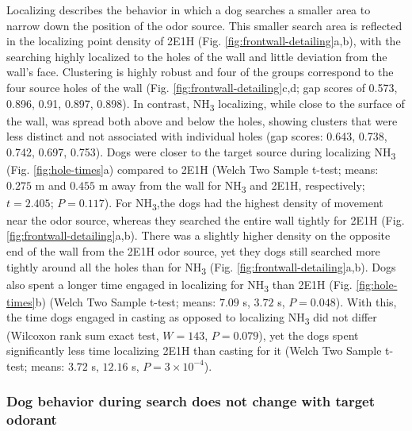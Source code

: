 \documentclass[
]{article}
\begin{document}
Localizing describes the behavior in which a dog searches a smaller area to narrow down the position of the odor source. This smaller search area is reflected in the localizing point density of 2E1H (Fig. \ref{fig:frontwall-detailing}a,b), with the searching highly localized to the holes of the wall and little deviation from the wall's face. Clustering is highly robust and four of the groups correspond to the four source holes of the wall (Fig. \ref{fig:frontwall-detailing}c,d; gap scores of 0.573, 0.896, 0.91, 0.897, 0.898). In contrast, NH\textsubscript{3} localizing, while close to the surface of the wall, was spread both above and below the holes, showing clusters that were less distinct and not associated with individual holes (gap scores: 0.643, 0.738, 0.742, 0.697, 0.753). Dogs were closer to the target source during localizing NH\textsubscript{3} (Fig. \ref{fig:hole-times}a) compared to 2E1H (Welch Two Sample t-test; means: \(0.275\) m and \(0.455\) m away from the wall for NH\textsubscript{3} and 2E1H, respectively; \(t = 2.405\); \(P = 0.117\)). For NH\textsubscript{3},the dogs had the highest density of movement near the odor source, whereas they searched the entire wall tightly for 2E1H (Fig. \ref{fig:frontwall-detailing}a,b). There was a slightly higher density on the opposite end of the wall from the 2E1H odor source, yet they dogs still searched more tightly around all the holes than for NH\textsubscript{3} (Fig. \ref{fig:frontwall-detailing}a,b). Dogs also spent a longer time engaged in localizing for NH\textsubscript{3} than 2E1H (Fig. \ref{fig:hole-times}b) (Welch Two Sample t-test; means: \(7.09\) s, \(3.72\) s, \(P = 0.048\)). With this, the time dogs engaged in casting as opposed to localizing NH\textsubscript{3} did not differ (Wilcoxon rank sum exact test, \(W = 143\), \(P = 0.079\)), yet the dogs spent significantly less time localizing 2E1H than casting for it (Welch Two Sample t-test; means: \(3.72\) s, \(12.16\) s, \(P = \ensuremath{3\times 10^{-4}}\)).

\hypertarget{dog-behavior-during-search-does-not-change-with-target-odorant}{%
\subsubsection{Dog behavior during search does not change with target odorant}\label{dog-behavior-during-search-does-not-change-with-target-odorant}}
\end{document}
